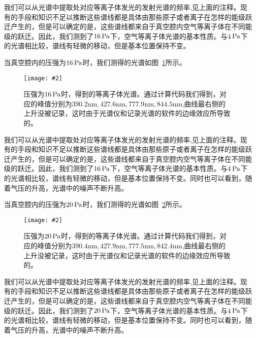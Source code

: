 \documentclass{ctexart}
\newcommand{\cpic}[2]{
\begin{center}
\texttt{[image: \#2]}
\end{center}
}
\newcommand{\cpicn}[3]
{
\begin{figure}[H]
\cpic{#1}{#2}
\caption{#3\label{#2}}
\end{figure}
}
\begin{document}
我们可以从光谱中提取处对应等离子体发光的发射光谱的频率,见上面的注释。现有的手段和知识不足以推断这些谱线都是具体由那些原子或者离子在怎样的能级跃迁产生的，但是可以确定的是，这些谱线都来自于真空腔内空气等离子体在不同能级的跃迁。因此，我们测到了$16\,\mathrm{Pa}$下，空气等离子体光谱的基本性质。与4$\,\mathrm{Pa}$下的光谱相比较，{\color{red}谱线有轻微的移动，但是基本位置保持不变。}

当真空腔内的压强为$16\,\mathrm{Pa}$时，我们测得的光谱如图~\ref{16}所示。

\cpicn{0.5}{16}{\color{red} 压强为$16\,\mathrm{Pa}$时，得到的等离子体光谱。通过计算代码我们得到，对应的峰值分别为$390.2\mathrm{nm},427.6\mathrm{nm},777.9\mathrm{nm},844.5\mathrm{nm}$,曲线最右侧的上升没被记录，这时由于光谱仪和记录光谱的软件的边缘效应所导致的。}

我们可以从光谱中提取处对应等离子体发光的发射光谱的频率,见上面的注释。现有的手段和知识不足以推断这些谱线都是具体由那些原子或者离子在怎样的能级跃迁产生的，但是可以确定的是，这些谱线都来自于真空腔内空气等离子体在不同能级的跃迁。因此，我们测到了$16\,\mathrm{Pa}$下，空气等离子体光谱的基本性质。与4$\,\mathrm{Pa}$下的光谱相比较，{\color{red}谱线有轻微的移动，但是基本位置保持不变。}同时也可以看到，随着气压的升高，光谱中的噪声不断升高。

当真空腔内的压强为$20\,\mathrm{Pa}$时，我们测得的光谱如图~\ref{20}所示。

\cpicn{0.5}{20}{\color{red} 压强为$20\,\mathrm{Pa}$时，得到的等离子体光谱。通过计算代码我们得到，对应的峰值分别为$390.4\mathrm{nm},427.9\mathrm{nm},777.5\mathrm{nm},842.4\mathrm{nm}$,曲线最右侧的上升没被记录，这时由于光谱仪和记录光谱的软件的边缘效应所导致的。}

我们可以从光谱中提取处对应等离子体发光的发射光谱的频率,见上面的注释。现有的手段和知识不足以推断这些谱线都是具体由那些原子或者离子在怎样的能级跃迁产生的，但是可以确定的是，这些谱线都来自于真空腔内空气等离子体在不同能级的跃迁。因此，我们测到了$20\,\mathrm{Pa}$下，空气等离子体光谱的基本性质。与4$\,\mathrm{Pa}$下的光谱相比较，{\color{red}谱线有轻微的移动，但是基本位置保持不变。}同时也可以看到，随着气压的升高，光谱中的噪声不断升高。
\end{document}
